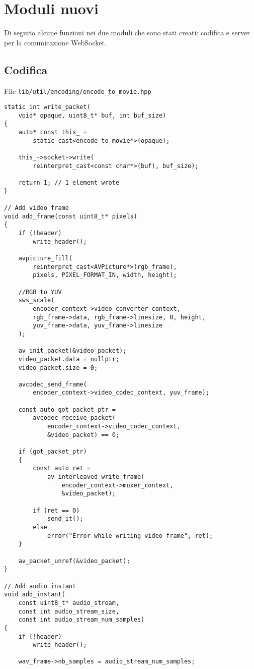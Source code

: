\section{Moduli nuovi}
Di seguito alcune funzioni nei due moduli che sono stati creati: codifica e server per la comunicazione WebSocket.


\subsection{Codifica}
File \verb|lib/util/encoding/encode_to_movie.hpp|

\begin{verbatim}
static int write_packet(
	void* opaque, uint8_t* buf, int buf_size)
{
	auto* const this_ = 
		static_cast<encode_to_movie*>(opaque);

	this_->socket->write(
		reinterpret_cast<const char*>(buf), buf_size);

	return 1; // 1 element wrote
}

// Add video frame
void add_frame(const uint8_t* pixels)
{
	if (!header)
		write_header();

	avpicture_fill(
		reinterpret_cast<AVPicture*>(rgb_frame),
		pixels, PIXEL_FORMAT_IN, width, height);
	
	//RGB to YUV
	sws_scale(
		encoder_context->video_converter_context,
		rgb_frame->data, rgb_frame->linesize, 0, height,
		yuv_frame->data, yuv_frame->linesize
	);

	av_init_packet(&video_packet);
	video_packet.data = nullptr;
	video_packet.size = 0;

	avcodec_send_frame(
		encoder_context->video_codec_context, yuv_frame);

	const auto got_packet_ptr = 
		avcodec_receive_packet(
			encoder_context->video_codec_context, 
			&video_packet) == 0;

	if (got_packet_ptr)
	{
		const auto ret = 
			av_interleaved_write_frame(
				encoder_context->muxer_context, 
				&video_packet);

		if (ret == 0)
			send_it();
		else
			error("Error while writing video frame", ret);
	}

	av_packet_unref(&video_packet);
}

// Add audio instant
void add_instant(
	const uint8_t* audio_stream, 
	const int audio_stream_size, 
	const int audio_stream_num_samples)
{
	if (!header)
		write_header();

	wav_frame->nb_samples = audio_stream_num_samples;


\end{verbatim}
